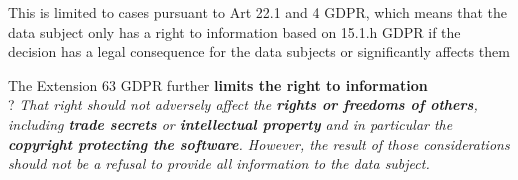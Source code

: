 \documentclass[11pt]{article}
\theoremstyle{definition}
\begin{document}
This is limited to cases pursuant to Art 22.1 and 4 GDPR, which means that the data subject only has a right to information based on 15.1.h GDPR if the decision has a legal consequence for the data subjects or significantly affects them

The Extension 63 GDPR further \textbf{limits the right to information}\\?
\emph{That right should not adversely affect the \textbf{rights or freedoms of others}, including \textbf{trade secrets} or \textbf{intellectual property} and in particular the \textbf{copyright protecting the software}. However, the result of those considerations should not be a refusal to provide all information to the data subject.}
\end{document}
